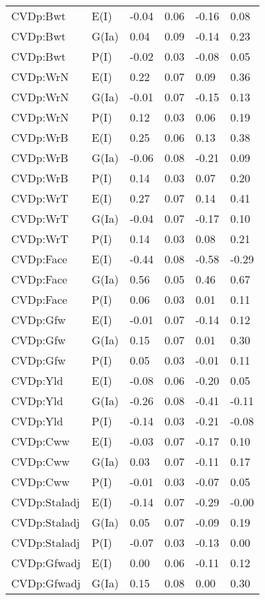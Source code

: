 \begin{center}
\begin{longtable}{|p{1.1in}|p{0.7in}|p{0.7in}|p{0.6in}|p{0.6in}|p{0.6in}|}
  CVDp:Bwt & E(I) & -0.04 & 0.06 & -0.16 & 0.08 \\ 
  CVDp:Bwt & G(Ia) & 0.04 & 0.09 & -0.14 & 0.23 \\ 
  CVDp:Bwt & P(I) & -0.02 & 0.03 & -0.08 & 0.05 \\ 
  CVDp:WrN & E(I) & 0.22 & 0.07 & 0.09 & 0.36 \\ 
  CVDp:WrN & G(Ia) & -0.01 & 0.07 & -0.15 & 0.13 \\ 
  CVDp:WrN & P(I) & 0.12 & 0.03 & 0.06 & 0.19 \\ 
  CVDp:WrB & E(I) & 0.25 & 0.06 & 0.13 & 0.38 \\ 
  CVDp:WrB & G(Ia) & -0.06 & 0.08 & -0.21 & 0.09 \\ 
  CVDp:WrB & P(I) & 0.14 & 0.03 & 0.07 & 0.20 \\ 
  CVDp:WrT & E(I) & 0.27 & 0.07 & 0.14 & 0.41 \\ 
  CVDp:WrT & G(Ia) & -0.04 & 0.07 & -0.17 & 0.10 \\ 
  CVDp:WrT & P(I) & 0.14 & 0.03 & 0.08 & 0.21 \\ 
  CVDp:Face & E(I) & -0.44 & 0.08 & -0.58 & -0.29 \\ 
  CVDp:Face & G(Ia) & 0.56 & 0.05 & 0.46 & 0.67 \\ 
  CVDp:Face & P(I) & 0.06 & 0.03 & 0.01 & 0.11 \\ 
  CVDp:Gfw & E(I) & -0.01 & 0.07 & -0.14 & 0.12 \\ 
  CVDp:Gfw & G(Ia) & 0.15 & 0.07 & 0.01 & 0.30 \\ 
  CVDp:Gfw & P(I) & 0.05 & 0.03 & -0.01 & 0.11 \\ 
  CVDp:Yld & E(I) & -0.08 & 0.06 & -0.20 & 0.05 \\ 
  CVDp:Yld & G(Ia) & -0.26 & 0.08 & -0.41 & -0.11 \\ 
  CVDp:Yld & P(I) & -0.14 & 0.03 & -0.21 & -0.08 \\ 
  CVDp:Cww & E(I) & -0.03 & 0.07 & -0.17 & 0.10 \\ 
  CVDp:Cww & G(Ia) & 0.03 & 0.07 & -0.11 & 0.17 \\ 
  CVDp:Cww & P(I) & -0.01 & 0.03 & -0.07 & 0.05 \\ 
  CVDp:Staladj & E(I) & -0.14 & 0.07 & -0.29 & -0.00 \\ 
  CVDp:Staladj & G(Ia) & 0.05 & 0.07 & -0.09 & 0.19 \\ 
  CVDp:Staladj & P(I) & -0.07 & 0.03 & -0.13 & 0.00 \\ 
  CVDp:Gfwadj & E(I) & 0.00 & 0.06 & -0.11 & 0.12 \\ 
  CVDp:Gfwadj & G(Ia) & 0.15 & 0.08 & 0.00 & 0.30 \\ 

\end{longtable}
\end{center}
